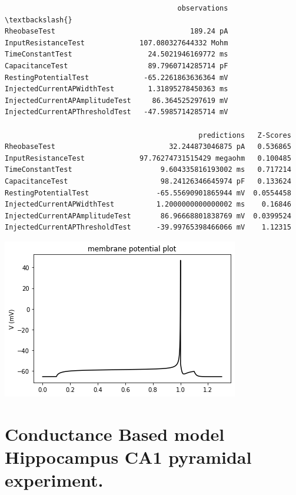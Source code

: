             \begin{tcolorbox}[breakable, size=fbox, boxrule=.5pt, pad at break*=1mm, opacityfill=0]
\begin{Verbatim}
                                         observations  \textbackslash{}
RheobaseTest                                189.24 pA
InputResistanceTest             107.080327644332 Mohm
TimeConstantTest                  24.5021946169772 ms
CapacitanceTest                   89.7960714285714 pF
RestingPotentialTest             -65.2261863636364 mV
InjectedCurrentAPWidthTest        1.31895278450363 ms
InjectedCurrentAPAmplitudeTest     86.364525297619 mV
InjectedCurrentAPThresholdTest   -47.5985714285714 mV

                                              predictions   Z-Scores
RheobaseTest                           32.244873046875 pA   0.536865
InputResistanceTest             97.76274731515429 megaohm   0.100485
TimeConstantTest                     9.604335816193002 ms   0.717214
CapacitanceTest                      98.24126346645974 pF   0.133624
RestingPotentialTest                -65.55690901865944 mV  0.0554458
InjectedCurrentAPWidthTest          1.2000000000000002 ms    0.16846
InjectedCurrentAPAmplitudeTest       86.96668801838769 mV  0.0399524
InjectedCurrentAPThresholdTest      -39.99765398466066 mV    1.12315
\end{Verbatim}
\end{tcolorbox}
        

    

    \begin{center}
    \includegraphics[]{notebooks_converted/make_normal_distribution_files/make_normal_distribution_8_2.png}
    \end{center}

    \hypertarget{conductance-based-model-hippocampus-ca1-pyramidal-experiment.}{%
\section{Conductance Based model Hippocampus CA1 pyramidal
experiment.}\label{conductance-based-model-hippocampus-ca1-pyramidal-experiment.}}

